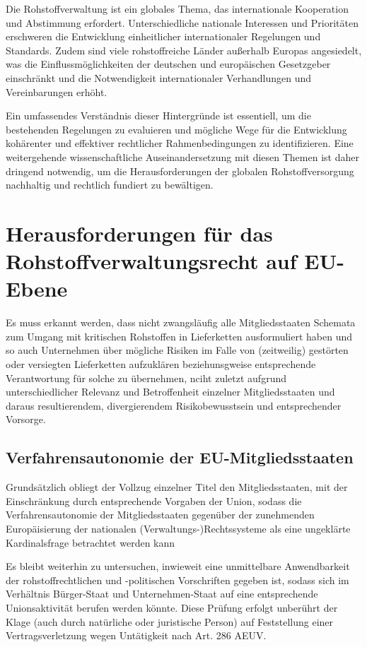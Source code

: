 \documentclass[12pt,a4paper,oneside]{book} %
\begin{document}
	Die Rohstoffverwaltung ist ein globales Thema, das internationale Kooperation und Abstimmung erfordert. Unterschiedliche nationale Interessen und Prioritäten erschweren die Entwicklung einheitlicher internationaler Regelungen und Standards. Zudem sind viele rohstoffreiche Länder außerhalb Europas angesiedelt, was die Einflussmöglichkeiten der deutschen und europäischen Gesetzgeber einschränkt und die Notwendigkeit internationaler Verhandlungen und Vereinbarungen erhöht.
	
	Ein umfassendes Verständnis dieser Hintergründe ist essentiell, um die bestehenden Regelungen zu evaluieren und mögliche Wege für die Entwicklung kohärenter und effektiver rechtlicher Rahmenbedingungen zu identifizieren. Eine weitergehende wissenschaftliche Auseinandersetzung mit diesen Themen ist daher dringend notwendig, um die Herausforderungen der globalen Rohstoffversorgung nachhaltig und rechtlich fundiert zu bewältigen.
	
	
	
	\section{Herausforderungen für das Rohstoffverwaltungsrecht auf EU-Ebene}
	Es muss erkannt werden, dass nicht zwangsläufig alle Mitgliedsstaaten Schemata zum Umgang mit kritischen Rohstoffen in Lieferketten ausformuliert haben und so auch Unternehmen über mögliche Risiken im Falle von (zeitweilig) gestörten oder versiegten Lieferketten aufzuklären beziehunsgweise entsprechende Verantwortung für solche zu übernehmen, nciht zuletzt aufgrund unterschiedlicher Relevanz und Betroffenheit einzelner Mitgliedsstaaten und daraus resultierendem, divergierendem Risikobewusstsein und entsprechender Vorsorge.
	
	\subsection{Verfahrensautonomie der EU-Mitgliedsstaaten}
	Grundsätzlich obliegt der Vollzug einzelner Titel den Mitgliedsstaaten, mit der Einschränkung durch entsprechende Vorgaben der Union, sodass die Verfahrensautonomie der Mitgliedsstaaten gegenüber der zunehmenden Europäisierung der nationalen (Verwaltungs-)Rechtssysteme als eine \glqq ungeklärte Kardinalsfrage\grqq \autocite{Ludiwgs, NVwZ 2018, 1417} betrachtet werden kann
	
	Es bleibt weiterhin zu untersuchen, inwieweit eine unmittelbare Anwendbarkeit der rohstoffrechtlichen und -politischen Vorschriften gegeben ist, sodass sich im Verhältnis Bürger-Staat und Unternehmen-Staat auf eine entsprechende Unionsaktivität berufen werden könnte. Diese Prüfung erfolgt unberührt der Klage (auch durch natürliche oder juristische Person) auf Feststellung einer Vertragsverletzung wegen Untätigkeit nach Art. 286 AEUV.
	
\end{document}
